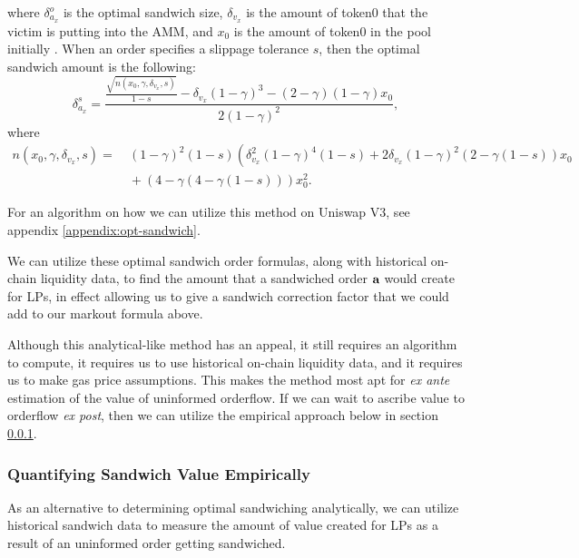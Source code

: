         where $\delta^o_{a_x}$ is the optimal sandwich size, $\delta_{v_x}$ is the amount of token0 that the victim is putting into the AMM, and $x_0$ is the amount of token0 in the pool initially \cite{heimbach2022eliminating}. When an order specifies a slippage tolerance $s$, then the optimal sandwich amount is the following:
        \begin{equation*}
            \delta_{a_x}^s=\frac{\frac{\sqrt{n\left(x_0, \gamma, \delta_{v_x}, s\right)}}{1-s}-\delta_{v_x}(1-\gamma)^3-(2-\gamma)(1-\gamma) x_0}{2(1-\gamma)^2},
        \end{equation*}
        where
        \begin{align*}
            n\left(x_0, \gamma, \delta_{v_x}, s\right) = &  \ (1-\gamma)^2(1-s)\left(\delta_{v_x}^2(1-\gamma)^4(1-s)\right. 
             +2 \delta_{v_x}(1-\gamma)^2(2-\gamma(1-s)) x_0 \\
            & \ + (4-\gamma(4-\gamma(1-s))) x_0^2.
        \end{align*}
        
        For an algorithm on how we can utilize this method on Uniswap V3, see appendix \ref{appendix:opt-sandwich}.

        We can utilize these optimal sandwich order formulas, along with historical on-chain liquidity data, to find the amount that a sandwiched order $\textbf a$  would create for LPs, in effect allowing us to give a sandwich correction factor that we could add to our markout formula above. 


        Although this analytical-like method has an appeal, it still requires an algorithm to compute, it requires us to use historical on-chain liquidity data, and it requires us to make gas price assumptions. This makes the method most apt for \textit{ex ante} estimation of the value of uninformed orderflow. If we can wait to ascribe value to orderflow \textit{ex post}, then we can utilize the empirical approach below in section \ref{section:sandwich-value-empirical}.

    
    \subsubsection{Quantifying Sandwich Value Empirically} \label{section:sandwich-value-empirical}
    
        As an alternative to determining optimal sandwiching analytically, we can utilize historical sandwich data to measure the amount of value created for LPs as a result of an uninformed order getting sandwiched.

